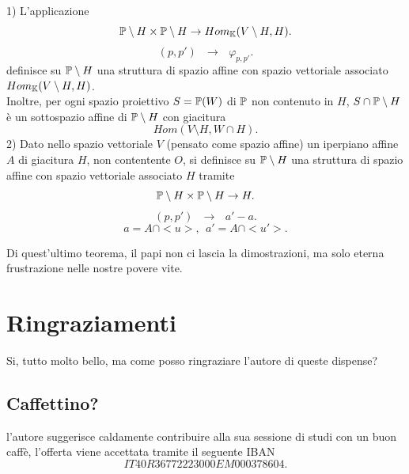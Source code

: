 \documentclass[12px]{article}
\begin{document}
 \begin{teo}
 	1) L'applicazione 
	\[
		\mathbb{P}\setminus H\times\mathbb{P}\setminus H \rightarrow Hom_{\mathbb{K}}(V\setminus H, H)
	.\] 
	\[
		(p,p') \ \ \ \rightarrow \ \ \ \varphi_{p,p'}
	.\] 
	definisce su $\mathbb{P}\setminus H$ una struttura di spazio affine con spazio vettoriale associato $Hom_{\mathbb{K}}(V\setminus H, H)$.\\
	Inoltre, per ogni spazio proiettivo $S = \mathbb{P}(W)$ di $\mathbb{P}$ non contenuto in  $H$, $S\cap \mathbb{P}\setminus H$ è un sottospazio affine di $\mathbb{P}\setminus H$ con giacitura
	\[
	Hom(V\setminus H, W\cap H)
	.\] 
	2) Dato nello spazio vettoriale $V$ (pensato come spazio affine) un iperpiano affine $A$ di giacitura $H$, non contentente $O$, si definisce su $\mathbb{P}\setminus H$ una struttura di spazio affine con spazio vettoriale associato $H$ tramite
	\[
	\mathbb{P}\setminus H\times\mathbb{P}\setminus H \rightarrow H
	.\] 
	\[
		(p,p') \ \ \ \rightarrow \ \ \ a'-a
	.\] 
	\[
	a = A\cap <u>, \ \ a' = A\cap <u'>
	.\] 
 \end{teo}
 Di quest'ultimo teorema, il papi non ci lascia la dimostrazioni, ma solo eterna frustrazione nelle nostre povere vite.
 \newpage
 \section{Ringraziamenti}
 Si, tutto molto bello, ma come posso ringraziare l'autore di queste dispense?\\[10px]
 \subsection{Caffettino?}
 l'autore suggerisce caldamente contribuire alla sua sessione di studi con un buon caffè, l'offerta viene accettata tramite il seguente IBAN
 \[
 IT40R36772223000EM000378604
 .\] 
\end{document}

